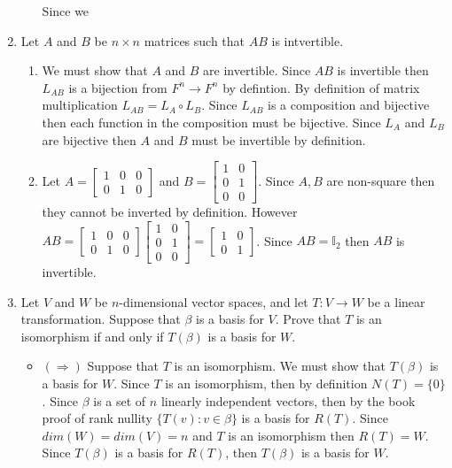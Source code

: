 \documentclass[12pt, letterpaper]{article}
\begin{document}
\begin{enumerate}
\begin{enumerate}
  Since we 
	\end{enumerate}
	\newpage		
	\item Let $A$ and $B$ be $n \times n$ matrices such that $AB$ is intvertible.  
	\begin{enumerate}
		\item We must show that $A$ and $B$ are invertible.  Since $AB$ is invertible then $L_{AB}$ is a bijection from $F^n \to F^n$ by defintion.  By definition of matrix multiplication $L_{AB} = L_A \circ L_B$.  Since $L_{AB}$ is a composition and bijective then each function in the composition must be bijective.  Since $L_A$ and $L_B$ are bijective then $A$ and $B$ must be invertible by definition.  
		\item Let $A = \begin{bmatrix}
			1 & 0 & 0\\
			0 & 1 & 0\end{bmatrix}$ and $B =\begin{bmatrix} 1 & 0\\ 0 & 1\\0 &0 \end{bmatrix} $.  Since $A,B$ are non-square then they cannot be inverted by definition.  However $AB = \begin{bmatrix}
			1 & 0 & 0\\
			0 & 1 & 0\end{bmatrix} \begin{bmatrix} 1 & 0\\ 0 & 1\\0 &0 \end{bmatrix} = \begin{bmatrix}
			1 & 0\\
			0 & 1
			\end{bmatrix}$.  Since $AB = \mathbb{I}_2$ then $AB$ is invertible.  
	\end{enumerate}
	\newpage
	\item Let $V$ and $W$ be $n$-dimensional vector spaces, and let $T: V \to W$ be a linear transformation.  Suppose that $\beta$ is a basis for $V$.  Prove that $T$ is an isomorphism if and only if $T(\beta)$ is a basis for $W$.  
	\begin{itemize}
		\item $(\Rightarrow)$  Suppose that $T$ is an isomorphism.  We must show that $T(\beta)$ is a basis for $W$.  Since $T$ is an isomorphism, then by definition $N(T) = \{0\}$.  Since $\beta$ is a set of $n$ linearly independent vectors, then by the book proof of rank nullity $\{T(v): v \in \beta \}$ is a basis for $R(T)$.  Since $dim(W) = dim(V) = n$ and $T$ is an isomorphism then $R(T) = W$.  Since $T(\beta)$ is a basis for $R(T)$, then $T(\beta)$ is a basis for $W$.  

\end{itemize}
\end{enumerate}
\end{document}
